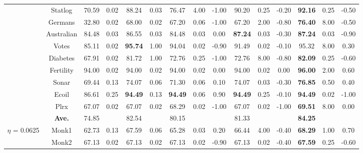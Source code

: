 \documentclass[journal,12pn, onecolumn]{IEEEtran}
\begin{document}
{{{\begin{table}
{{\begin{tabular}{ccccccccccccccc}
    \multicolumn{1}{c}{} & \multicolumn{1}{c}{Statlog} & 70.59  & 0.02  & 88.24  & 0.03  & 76.47  & 4.00  & -1.00  & 90.20  & 0.25  & -0.20  & \textbf{92.16 } & 0.25  & -0.50  \\
    \multicolumn{1}{c}{} & \multicolumn{1}{c}{Germans} & 32.80  & 0.02  & 68.00  & 0.02  & 67.20  & 0.06  & -1.00  & 67.20  & 2.00  & -0.80  & \textbf{76.40 } & 8.00  & -0.50  \\
    \multicolumn{1}{c}{} & \multicolumn{1}{c}{Australian} & 84.48  & 0.03  & 86.55  & 0.03  & 84.48  & 0.03  & 0.00  & \textbf{87.24 } & 0.03  & -0.30  & \textbf{87.24 } & 0.03  & -0.90  \\
    \multicolumn{1}{c}{} & \multicolumn{1}{c}{Votes} & 85.11  & 0.02  & \textbf{95.74 } & 1.00  & 94.04  & 0.02  & -0.90  & 91.49  & 0.02  & -0.10  & 95.32  & 8.00  & 0.30  \\
    \multicolumn{1}{c}{} & \multicolumn{1}{c}{Diabetes} & 67.91  & 0.02  & 81.72  & 1.00  & 72.76  & 0.25  & -1.00  & 72.76  & 8.00  & -0.80  & \textbf{82.09 } & 0.25  & -0.60  \\
    \multicolumn{1}{c}{} & \multicolumn{1}{c}{Fertility} & 94.00  & 0.02  & 94.00  & 0.02  & 94.00  & 0.02  & 0.00  & 94.00  & 0.02  & 0.00  & \textbf{96.00 } & 2.00  & 0.60  \\
    \multicolumn{1}{c}{} & \multicolumn{1}{c}{Sonar} & 69.44  & 0.13  & 74.07  & 0.06  & 71.30  & 0.06  & 0.10  & 74.07  & 0.03  & -0.30  & \textbf{76.85 } & 0.50  & 0.40  \\
    \multicolumn{1}{c}{} & \multicolumn{1}{c}{Ecoil} & 86.61  & 0.25  & \textbf{94.49 } & 0.13  & \textbf{94.49 } & 0.06  & 0.90  & \textbf{94.49 } & 0.25  & -0.10  & \textbf{94.49 } & 0.02  & -1.00  \\
    \multicolumn{1}{c}{} & \multicolumn{1}{c}{Plrx} & 67.07  & 0.02  & 67.07  & 0.02  & 68.29  & 0.02  & -1.00  & 67.07  & 0.02  & -1.00  & \textbf{69.51 } & 8.00  & 0.00  \\
\cmidrule{2-15}    \multicolumn{1}{c}{} & \multicolumn{1}{c}{\textbf{Ave. }} & 74.85  &       & 82.54  &       & 80.15  &       &       & 81.33  &       &       & \textbf{84.25 } &       &  \\
    \midrule
    \multicolumn{1}{c}{\multirow{18}[4]{*}{$\eta$ = 0.0625}} & \multicolumn{1}{c}{Monk1} & 62.73  & 0.13  & 67.59  & 0.06  & 65.28  & 0.03  & 0.20  & 66.44  & 4.00  & -0.40  & \textbf{68.29 } & 1.00  & 0.70  \\
    \multicolumn{1}{c}{} & \multicolumn{1}{c}{Monk2} & 67.13  & 0.02  & 67.13  & 0.02  & 67.13  & 0.02  & -0.90  & 67.13  & 0.02  & -0.40  & \textbf{67.59 } & 0.25  & -0.60  \\

\end{tabular}}}
\end{table}}}}
\end{document}

